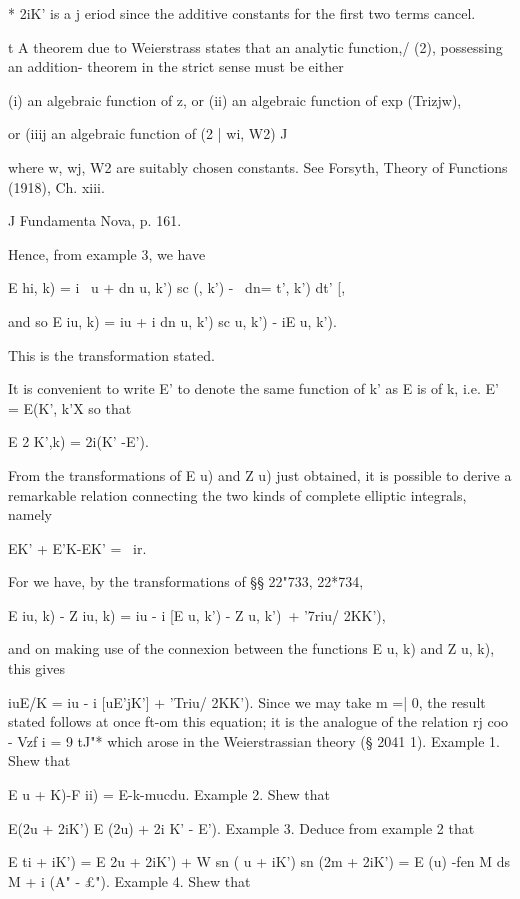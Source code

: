 * 2iK' is a j eriod since the additive constants for the first two
terms cancel.

t A theorem due to Weierstrass states that an analytic function,/ (2),
possessing an addition- theorem in the strict sense must be either

(i) an algebraic function of z, or (ii) an algebraic function of exp
(Trizjw),

or (iiij an algebraic function of (2 | wi, W2) J

where w, wj, W2 are suitably chosen constants. See Forsyth, Theory of
Functions (1918), Ch. xiii.

J Fundamenta Nova, p. 161.

%
%

Hence, from example 3, we have

E hi, k) = i \ u + dn u, k') sc (, k') - \ dn= t', k') dt' [,

and so E iu, k) = iu + i dn u, k') sc u, k') - iE u, k').

This is the transformation stated.

It is convenient to write E' to denote the same function of k' as E is
of k, i.e. E' = E(K', k'X so that

E 2 K',k) = 2i(K' -E').


From the transformations of E u) and Z u) just obtained, it is
possible to derive a remarkable relation connecting the two kinds of
complete elliptic integrals, namely

EK' + E'K-EK' = \ ir.

For we have, by the transformations of §§ 22"733, 22*734,

E iu, k) - Z iu, k) = iu - i [E u, k') - Z u, k')\ + '7riu/ 2KK'),

and on making use of the connexion between the functions E u, k) and Z
u, k), this gives

iuE/K = iu - i [uE'jK'] + 'Triu/ 2KK'). Since we may take m =| 0, the
result stated follows at once ft-om this equation; it is the analogue
of the relation rj coo - Vzf i = 9 tJ"* which arose in the
Weierstrassian theory (§ 2041 1). Example 1. Shew that

E u + K)-F ii) = E-k-mucdu. Example 2. Shew that

E(2u + 2iK') E (2u) + 2i K' - E'). Example 3. Deduce from example 2
that

E ti + iK') = E 2u + 2iK') + W sn ( u + iK') sn (2m + 2iK') = E (u)
-fen M ds M + i (A" - £"). Example 4. Shew that


